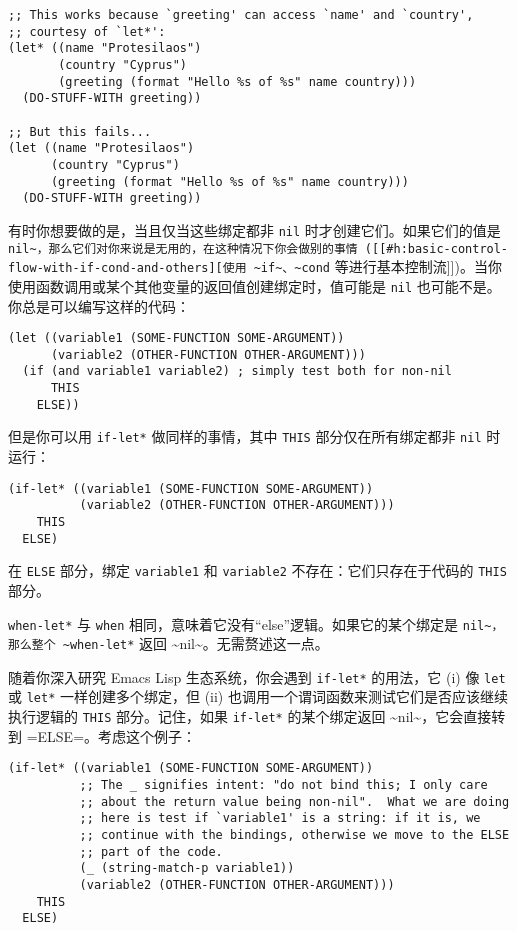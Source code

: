 \documentclass[11pt]{ctexart}
\begin{document}
\begin{verbatim}
;; This works because `greeting' can access `name' and `country',
;; courtesy of `let*':
(let* ((name "Protesilaos")
       (country "Cyprus")
       (greeting (format "Hello %s of %s" name country)))
  (DO-STUFF-WITH greeting))

;; But this fails...
(let ((name "Protesilaos")
      (country "Cyprus")
      (greeting (format "Hello %s of %s" name country)))
  (DO-STUFF-WITH greeting))
\end{verbatim}

有时你想要做的是，当且仅当这些绑定都非 \texttt{nil} 时才创建它们。如果它们的值是 \texttt{nil\textasciitilde{}，那么它们对你来说是无用的，在这种情况下你会做别的事情 ([[\#h:basic-control-flow-with-if-cond-and-others][使用 \textasciitilde{}if\textasciitilde{}、\textasciitilde{}cond} 等进行基本控制流]])。当你使用函数调用或某个其他变量的返回值创建绑定时，值可能是 \texttt{nil} 也可能不是。你总是可以编写这样的代码：

\begin{verbatim}
(let ((variable1 (SOME-FUNCTION SOME-ARGUMENT))
      (variable2 (OTHER-FUNCTION OTHER-ARGUMENT)))
  (if (and variable1 variable2) ; simply test both for non-nil
      THIS
    ELSE))
\end{verbatim}

但是你可以用 \texttt{if-let*} 做同样的事情，其中 \texttt{THIS} 部分仅在所有绑定都非 \texttt{nil} 时运行：

\begin{verbatim}
(if-let* ((variable1 (SOME-FUNCTION SOME-ARGUMENT))
          (variable2 (OTHER-FUNCTION OTHER-ARGUMENT)))
    THIS
  ELSE)
\end{verbatim}

在 \texttt{ELSE} 部分，绑定 \texttt{variable1} 和 \texttt{variable2} 不存在：它们只存在于代码的 \texttt{THIS} 部分。

\texttt{when-let*} 与 \texttt{when} 相同，意味着它没有“else”逻辑。如果它的某个绑定是 \texttt{nil\textasciitilde{}，那么整个 \textasciitilde{}when-let*} 返回 \textasciitilde{}nil\textasciitilde{}。无需赘述这一点。

随着你深入研究 Emacs Lisp 生态系统，你会遇到 \texttt{if-let*} 的用法，它 (i) 像 \texttt{let} 或 \texttt{let*} 一样创建多个绑定，但 (ii) 也调用一个谓词函数来测试它们是否应该继续执行逻辑的 \texttt{THIS} 部分。记住，如果 \texttt{if-let*} 的某个绑定返回 \textasciitilde{}nil\textasciitilde{}，它会直接转到 =ELSE=。考虑这个例子：

\begin{verbatim}
(if-let* ((variable1 (SOME-FUNCTION SOME-ARGUMENT))
          ;; The _ signifies intent: "do not bind this; I only care
          ;; about the return value being non-nil".  What we are doing
          ;; here is test if `variable1' is a string: if it is, we
          ;; continue with the bindings, otherwise we move to the ELSE
          ;; part of the code.
          (_ (string-match-p variable1))
          (variable2 (OTHER-FUNCTION OTHER-ARGUMENT)))
    THIS
  ELSE)
\end{verbatim}
\end{document}
